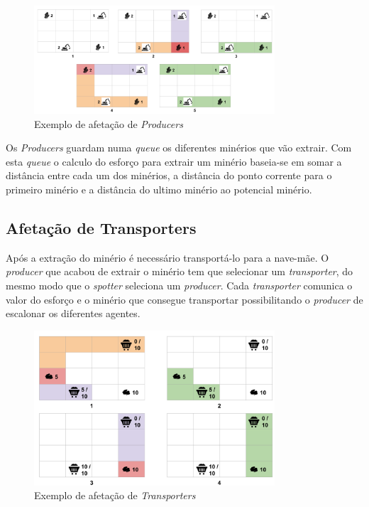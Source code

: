 \documentclass[12pt]{report}
\begin{document}
\begin{figure}[h]
  \centering
    \includegraphics[width=0.8\textwidth]{producer-scheduling}
  \caption{\small{Exemplo de afetação de \textit{Producers}}}
\end{figure}

Os \emph{Producers} guardam numa \emph{queue} os diferentes minérios que vão extrair. Com esta \emph{queue} o calculo do esforço
para extrair um minério baseia-se em somar a distância entre cada um dos minérios, a distância do ponto corrente para o primeiro
minério e a distância do ultimo minério ao potencial minério.

\FloatBarrier
\newpage
\subsection{Afetação de Transporters}
Após a extração do minério é necessário transportá-lo para a nave-mãe. O \emph{producer} que acabou de extrair o minério tem que selecionar 
um \emph{transporter}, do mesmo modo que o \emph{spotter} seleciona um \emph{producer}. Cada \emph{transporter} comunica o valor
do esforço e o minério que consegue transportar possibilitando o \emph{producer} de escalonar os diferentes agentes.

\begin{figure}[h]
  \centering
    \includegraphics[width=0.8\textwidth]{transporter-scheduling}
  \caption{\small{Exemplo de afetação de \textit{Transporters}}}
\end{figure}
\end{document}
